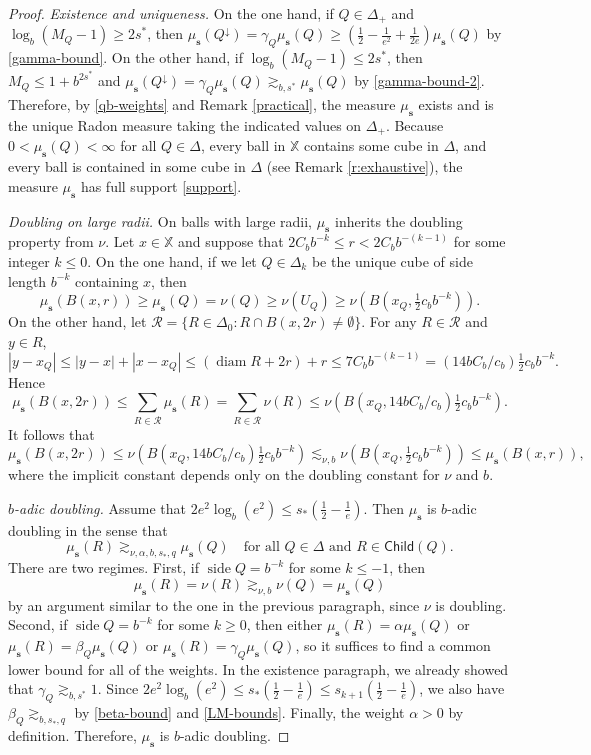 \documentclass[12pt]{amsart}
\theoremstyle{definition}
\theoremstyle{remark}
\newcommand{\XX}{\mathbb{X}}
\newcommand{\diam}{\mathop\mathrm{diam}\nolimits}
\newcommand{\side}{\mathop\mathrm{side}\nolimits}
\newcommand{\muse}{\mu_{\mathbf{s}}}
\newcommand{\Child}{\mathsf{Child}}
\numberwithin{figure}{section}
\numberwithin{equation}{section}
\begin{document}
\begin{proof} \emph{Existence and uniqueness.} On the one hand, if $Q\in\Delta_+$ and $\log_b(M_Q-1)\geq 2s^*$, then $\muse(Q^\downarrow)=\gamma_Q\muse(Q)\geq (\frac{1}{2}-\frac{1}{e^2}+\frac{1}{2e})\muse(Q)$ by \eqref{gamma-bound}. On the other hand, if $\log_b(M_Q-1)\leq 2s^*$, then $M_Q\leq 1+b^{2s^*}$ and $\muse(Q^\downarrow)=\gamma_Q\muse(Q)\gtrsim_{b,s^*}\muse(Q)$ by \eqref{gamma-bound-2}. Therefore, by \eqref{qb-weights} and Remark \ref{practical}, the measure $\muse$ exists and is the unique Radon measure taking the indicated values on $\Delta_+$. Because $0<\muse(Q)<\infty$ for all $Q\in\Delta$, every ball in $\XX$ contains some cube in $\Delta$, and every ball is contained in some cube in $\Delta$ (see Remark \ref{r:exhaustive}), the measure $\muse$ has full support \eqref{support}.

\emph{Doubling on large radii.} On balls with large radii, $\muse$ inherits the doubling property from $\nu$. Let $x\in\XX$ and suppose that $2C_b b^{-k}\leq r<2C_b b^{-(k-1)}$ for some integer $k\leq 0$. On the one hand, if we let $Q\in \Delta_k$ be the unique cube of side length $b^{-k}$ containing $x$, then $$\muse(B(x,r))\geq \muse(Q)=\nu(Q)\geq \nu(U_Q)\geq \nu(B(x_Q,\tfrac{1}{2}c_b b^{-k})).$$ On the other hand, let $\mathcal{R}=\{R\in\Delta_0:R\cap B(x,2r)\neq\emptyset\}$. For any $R\in\mathcal{R}$ and $y\in R$, $$|y-x_Q|\leq |y-x|+|x-x_Q|\leq (\diam R+2r)+r\leq 7C_b b^{-(k-1)}=(14bC_b/c_b)\tfrac12c_b b^{-k}.$$ Hence $$\muse(B(x,2r))\leq \sum_{R\in\mathcal{R}} \muse(R) = \sum_{R\in\mathcal{R}} \nu(R) \leq \nu(B(x_Q,14b C_b/c_b) \tfrac{1}{2}c_bb^{-k}).$$ It follows that $$\muse(B(x,2r)) \leq \nu(B(x_Q,14b C_b/c_b) \tfrac{1}{2}c_bb^{-k}) \lesssim_{\nu,b} \nu(B(x_Q,\tfrac{1}{2}c_b b^{-k}))\leq \muse(B(x,r)),$$ where the implicit constant depends only on the doubling constant for $\nu$ and $b$.

\emph{$b$-adic doubling.} Assume that $2e^2\log_b(e^2)\leq s_*(\tfrac12-\tfrac{1}{e})$. Then $\muse$ is $b$-adic doubling in the sense that \begin{equation}\label{b-adic-doubling}\muse(R)\gtrsim_{\nu,\alpha,b,s_*,q}\muse(Q)\quad\text{for all $Q\in\Delta$ and $R\in\Child(Q)$}.\end{equation} There are two regimes. First, if $\side Q=b^{-k}$ for some $k\leq -1$, then $$\muse(R)=\nu(R)\gtrsim_{\nu,b}\nu(Q)=\muse(Q)$$ by an argument similar to the one in the previous paragraph, since $\nu$ is doubling. Second, if $\side Q=b^{-k}$ for some $k\geq 0$, then either $\muse(R)=\alpha\muse(Q)$ or $\muse(R)=\beta_Q\muse(Q)$ or $\muse(R)=\gamma_Q\muse(Q)$, so it suffices to find a common lower bound for all of the weights. In the existence paragraph, we already showed that $\gamma_Q\gtrsim_{b,s^*}1$. Since $2e^2\log_b(e^2)\leq s_*(\tfrac12-\tfrac{1}{e})\leq s_{k+1}(\tfrac12-\tfrac{1}{e})$, we also have $\beta_Q\gtrsim_{b,s_*,q}$ by \eqref{beta-bound} and \eqref{LM-bounds}. Finally, the weight $\alpha>0$ by definition. Therefore, $\muse$ is $b$-adic doubling.


\end{proof}
\end{document}
